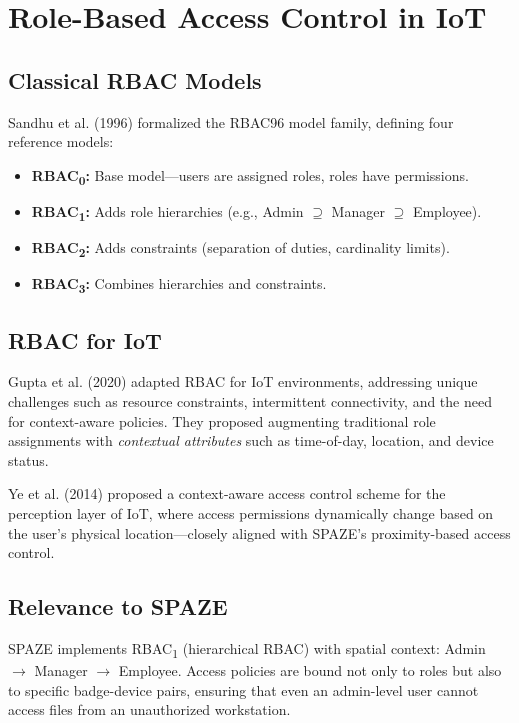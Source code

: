 \documentclass[conference]{IEEEtran}
\begin{document}
\section{Role-Based Access Control in IoT}
\label{sec:rbac}

\subsection{Classical RBAC Models}
Sandhu et al. (1996) \cite{sandhu1996} formalized the RBAC96 model family, defining four reference models:
\begin{itemize}[noitemsep]
    \item \textbf{RBAC\textsubscript{0}:} Base model—users are assigned roles, roles have permissions.
    \item \textbf{RBAC\textsubscript{1}:} Adds role hierarchies (e.g., Admin $\supseteq$ Manager $\supseteq$ Employee).
    \item \textbf{RBAC\textsubscript{2}:} Adds constraints (separation of duties, cardinality limits).
    \item \textbf{RBAC\textsubscript{3}:} Combines hierarchies and constraints.
\end{itemize}

\subsection{RBAC for IoT}
Gupta et al. (2020) \cite{gupta2020} adapted RBAC for IoT environments, addressing unique challenges such as resource constraints, intermittent connectivity, and the need for context-aware policies. They proposed augmenting traditional role assignments with \textit{contextual attributes} such as time-of-day, location, and device status.

Ye et al. (2014) \cite{ye2014} proposed a context-aware access control scheme for the perception layer of IoT, where access permissions dynamically change based on the user's physical location—closely aligned with SPAZE's proximity-based access control.

\subsection{Relevance to SPAZE}
SPAZE implements RBAC\textsubscript{1} (hierarchical RBAC) with spatial context: Admin $\rightarrow$ Manager $\rightarrow$ Employee. Access policies are bound not only to roles but also to specific badge-device pairs, ensuring that even an admin-level user cannot access files from an unauthorized workstation.
\end{document}
